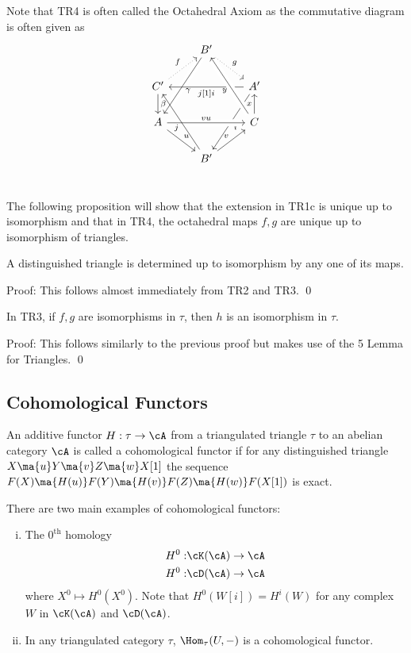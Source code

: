 \begin{rem}
Note that TR4 is often called the Octahedral Axiom as the commutative diagram is often given as
\[
\begin{tikzcd}
 \phantom{x} & B' \arrow[dotted]{dr}{g} \arrow[crossing over]{ddl}{\gamma} & \\
 C' \arrow{d}{\beta} \arrow[dotted]{ur}{f} & & A' \arrow{ll}{j[1]i} \arrow{ddl}{i} \\
 A\arrow{dr}{u} \arrow[crossing over]{rr}{vu} & & C \arrow{u}{x} \arrow[crossing over]{uul}{y} \\
 & B' \arrow{uul}{j} \arrow{ur}{v} & \\
\end{tikzcd}
\]
\end{rem}

The following proposition will show that the extension in TR1c is unique up to isomorphism and that in TR4, the octahedral maps $f,g$ are unique up to isomorphism of triangles. 

\begin{prop}
A distinguished triangle is determined up to isomorphism by any one of its maps. 
\end{prop}

Proof: This follows almost immediately from TR2 and TR3. \qed \\

\begin{prop}
In TR3, if $f,g$ are isomorphisms in $\tau$, then $h$ is an isomorphism in $\tau$.
\end{prop}

Proof: This follows similarly to the previous proof but makes use of the 5 Lemma for Triangles. \qed \\

\subsection{Cohomological Functors}

\begin{dfn}
An additive functor $H: \tau \to \cA$ from a triangulated triangle $\tau$ to an abelian category $\cA$ is called a cohomological functor if for any distinguished triangle $X \ma{u} Y \ma{v} Z \ma{w} X[1]$ the sequence $F(X) \ma{H(u)} F(Y) \ma{H(v)} F(Z) \ma{H(w)} F(X[1])$ is exact. 
\end{dfn}

\begin{ex}
There are two main examples of cohomological functors:
\begin{enumerate}[(i)]
\item The $0^\text{th}$ homology
\[
\begin{split}
H^0:& \cK(\cA) \to \cA \\
H^0:& \cD(\cA) \to \cA 
\end{split}
\]
where $X^0 \mapsto H^0(X^0)$. Note that $H^0(W[i])=H^i(W)$ for any complex $W$ in $\cK(\cA)$ and $\cD(\cA)$. 
\item In any triangulated category $\tau$, $\Hom_\tau(U,-)$ is a cohomological functor. 
\end{enumerate}
\end{ex}

